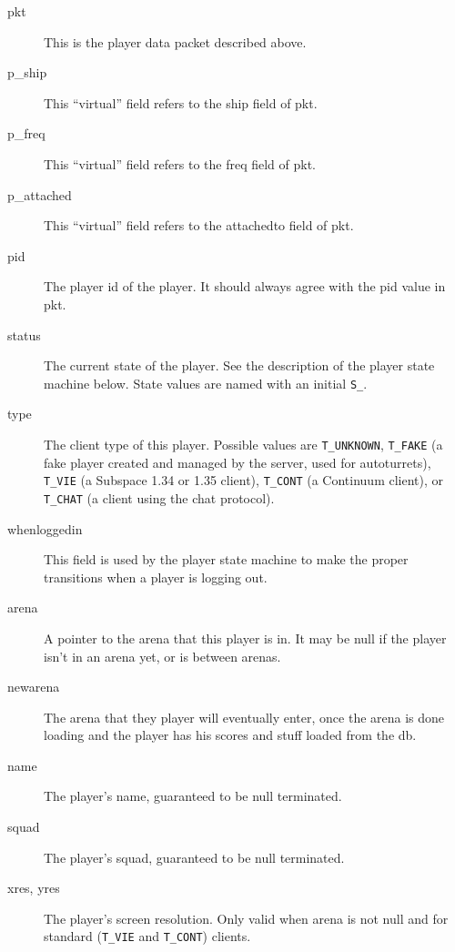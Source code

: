 \documentclass{article}
\begin{document}
\begin{description}

\item[pkt] This is the player data packet described above.

\item[p\_ship] This ``virtual'' field refers to the ship field of pkt.

\item[p\_freq] This ``virtual'' field refers to the freq field of pkt.

\item[p\_attached] This ``virtual'' field refers to the attachedto field
of pkt.

\item[pid] The player id of the player. It should always agree with the
pid value in pkt.

\item[status] The current state of the player. See the description of
the player state machine below. State values are named with an initial
\verb/S_/.

\item[type] The client type of this player. Possible values are
\verb/T_UNKNOWN/, \verb/T_FAKE/ (a fake player created and managed by
the server, used for autoturrets), \verb/T_VIE/ (a Subspace 1.34 or 1.35
client), \verb/T_CONT/ (a Continuum client), or \verb/T_CHAT/ (a client
using the chat protocol).

\item[whenloggedin] This field is used by the player state machine to
make the proper transitions when a player is logging out.

\item[arena] A pointer to the arena that this player is in. It may be
null if the player isn't in an arena yet, or is between arenas.

\item[newarena] The arena that they player will eventually enter, once
the arena is done loading and the player has his scores and stuff loaded
from the db.

\item[name] The player's name, guaranteed to be null terminated.

\item[squad] The player's squad, guaranteed to be null terminated.

\item[xres, yres] The player's screen resolution. Only valid when arena
is not null and for standard (\verb/T_VIE/ and \verb/T_CONT/) clients.


\end{description}
\end{document}
